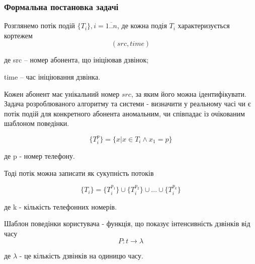 \subsubsection{Формальна постановка задачі}


  Розглянемо потік подій $\{T_i\}, i = \overline{1..n}$, де кожна подія $T_i$ характеризується кортежем
  \begin{equation}\label{eq:tuple} (src, time) \end{equation}
  \begin{ESKDexplanation}
    \item де src -- номер абонента, що ініціював дзвінок;
    \item time -- час ініціювання дзвінка.
  \end{ESKDexplanation}

  Кожен абонент має унікальний номер $src$, за яким його можна ідентифікувати. Задача розроблюваного алгоритму та системи - визначити у реальному часі чи є потік подій для конкретного абонента аномальним, чи співпадає із очікованим шаблоном поведінки.

  \begin{equation}\label{eq:stream}\{T_i^{p}\} = \{x | x \in T_i \wedge x_1 = p\}\end{equation}
  \begin{ESKDexplanation}
    \item де p - номер телефону.
  \end{ESKDexplanation}

  Тоді потік можна записати як сукупність потоків 

  \begin{equation}\label{eq:stream_sum}\{T_i\} = \{T_i^{p_1}\} \cup \{T_i^{p_2}\} \cup ... \cup \{T_i^{p_k}\} \end{equation}
  \begin{ESKDexplanation}
    \item де k - кількість телефонних номерів.
  \end{ESKDexplanation}

  Шаблон поведінки користувача - функція, що показує інтенсивність дзвінків від часу
  \begin{equation}\label{eq:pattern}P: t \rightarrow \lambda \end{equation}

  \begin{ESKDexplanation}
    \item де $\lambda$ - це кількість дзвінків на одиницю часу.
  \end{ESKDexplanation}

